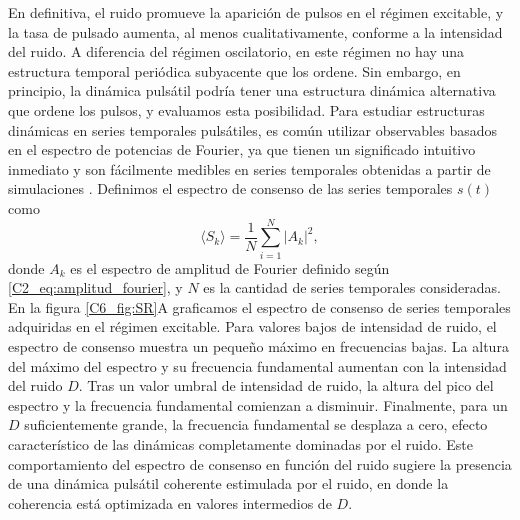 \documentclass[./main.tex]{subfiles}
\begin{document}
En definitiva, el ruido promueve la aparición de pulsos en el régimen excitable, y la tasa de pulsado aumenta, al menos cualitativamente, conforme a la intensidad del ruido. A diferencia del régimen oscilatorio, en este régimen no hay una estructura temporal periódica subyacente que los ordene. Sin embargo, en principio, la dinámica pulsátil podría tener una estructura dinámica alternativa que ordene los pulsos, y evaluamos esta posibilidad. Para estudiar estructuras dinámicas en series temporales pulsátiles, es común utilizar observables basados en el espectro de potencias de Fourier, ya que tienen un significado intuitivo inmediato y son fácilmente medibles en series temporales obtenidas a partir de simulaciones \cite{Gammaitoni1998}. Definimos el espectro de consenso de las series temporales $s(t)$ como \cite{Ditzinger1994} 
\begin{equation}
    \langle S_k \rangle = \frac{1}{N} \sum_{i=1}^N |A_k|^2,
    \label{C6_eq:espectro_consenso}
\end{equation}
donde $A_k$ es el espectro de amplitud de Fourier definido según \ref{C2_eq:amplitud_fourier}, y $N$ es la cantidad de series temporales consideradas. En la figura \ref{C6_fig:SR}A graficamos el espectro de consenso de series temporales adquiridas en el régimen excitable. Para valores bajos de intensidad de ruido, el espectro de consenso muestra un pequeño máximo en frecuencias bajas. La altura del máximo del espectro y su frecuencia fundamental aumentan con la intensidad del ruido $D$. Tras un valor umbral de intensidad de ruido, la altura del pico del espectro y la frecuencia fundamental comienzan a disminuir. Finalmente, para un $D$ suficientemente grande, la frecuencia fundamental se desplaza a cero, efecto característico de las dinámicas completamente dominadas por el ruido. Este comportamiento del espectro de consenso en función del ruido sugiere la presencia de una dinámica pulsátil coherente estimulada por el ruido, en donde la coherencia está optimizada en valores intermedios de $D$. 
\end{document}
